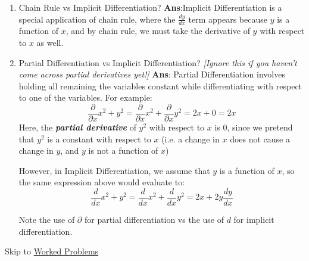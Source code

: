 \documentclass{article}
\begin{document}
\begin{enumerate}
    \item Chain Rule vs Implicit Differentiation?
    \vspace{3pt}
    \newline
    \textbf{Ans}:Implicit Differentiation is a special application of chain rule, where the $\frac{dy}{dx}$ term appears because $y$ is a function of $x$, and by chain rule, we must take the derivative of $y$ with respect to $x$ as well. 

    \item Partial Differentiation vs Implicit Differentiation? \textit{[Ignore this if you haven't come across partial derivatives yet!]}
    \vspace{3pt}
    \newline
    \textbf{Ans}: Partial Differentiation involves holding all remaining the variables constant while differentiating with respect to one of the variables. 
    For example:
    $$\frac{\partial}{\partial x} x^2+y^2 = \frac{\partial}{\partial x} x^2 + \frac{\partial }{\partial x} y^2 = 2x + 0 = 2x$$
    Here, the \textbf{\textit{partial derivative}} of $y^2$ with respect to $x$ is 0, since we pretend that $y^2$ is a constant with respect to $x$ (i.e. a change in $x$ does not cause a change in $y$, and $y$ is not a function of $x$)

    However, in Implicit Differentiation, we assume that $y$ is a function of $x$, so the same expression above would evaluate to:
    $$\frac{d}{dx} x^2 + y^2 = \frac{d}{dx}x^2 +\frac{d}{dx}y^2 = 2x + 2y\frac{dy}{dx}$$

    Note the use of $\partial$ for partial differentiation vs the use of $d$ for implicit differentiation. 
    
\end{enumerate}


Skip to \hyperref[WorkedProblems]{Worked Problems}
\end{document}
